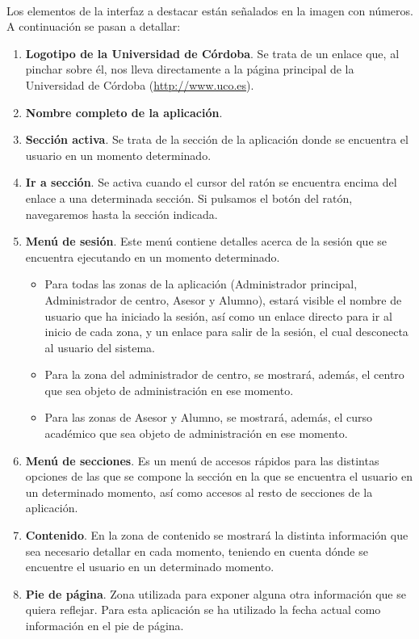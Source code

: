   \paragraph{}Los elementos de la interfaz a destacar están señalados en la
  imagen con números. A continuación se pasan a detallar:

  \begin{enumerate}
    \item \textbf{Logotipo de la Universidad de Córdoba}. Se trata de un
    enlace que, al pinchar sobre él, nos lleva directamente a la página
    principal de la Universidad de Córdoba (\url{http://www.uco.es}).
    \item \textbf{Nombre completo de la aplicación}.
    \item \textbf{Sección activa}. Se trata de la sección de la aplicación donde
    se encuentra el usuario en un momento determinado.
    \item \textbf{Ir a sección}. Se activa cuando el cursor del ratón se
    encuentra encima del enlace a una determinada sección. Si pulsamos el botón
    del ratón, navegaremos hasta la sección indicada.
    \item \textbf{Menú de sesión}. Este menú contiene detalles acerca de la
    sesión que se encuentra ejecutando en un momento determinado.
    \begin{itemize}
      \item Para todas las zonas de la aplicación (Administrador principal,
      Administrador de centro, Asesor y Alumno), estará visible el nombre de
      usuario que ha iniciado la sesión, así como un enlace directo para ir al
      inicio de cada zona, y un enlace para salir de la sesión, el cual
      desconecta al usuario del sistema.
      \item Para la zona del administrador de centro, se mostrará, además,
      el centro que sea objeto de administración en ese momento.
      \item Para las zonas de Asesor y Alumno, se mostrará, además, el curso
      académico que sea objeto de administración en ese momento.
    \end{itemize}

    \item \textbf{Menú de secciones}. Es un menú de accesos rápidos para las
    distintas opciones de las que se compone la sección en la que se encuentra
    el usuario en un determinado momento, así como accesos al resto de
    secciones de la aplicación.
    \item \textbf{Contenido}. En la zona de contenido se mostrará la distinta
    información que sea necesario detallar en cada momento, teniendo en cuenta
    dónde se encuentre el usuario en un determinado momento.
    \item \textbf{Pie de página}. Zona utilizada para exponer alguna otra
    información que se quiera reflejar. Para esta aplicación se ha utilizado
    la fecha actual como información en el pie de página.
  \end{enumerate}

